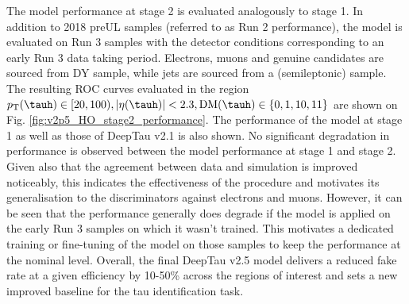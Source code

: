The model performance at stage 2 is evaluated analogously to stage 1. In addition to 2018 preUL samples (referred to as Run 2 performance), the model is evaluated on Run 3 samples with the detector conditions corresponding to an early Run 3 data taking period. Electrons, muons and genuine \tauh candidates are sourced from DY sample, while jets are sourced from a \ttbar (semileptonic) sample. The resulting ROC curves evaluated in the region $p_\text{T}(\tauh) \in [20,100), |\eta(\tauh)| < 2.3, \text{DM}(\tauh) \in \{0,1,10,11\}$ are shown on Fig. \ref{fig:v2p5_HO_stage2_performance}. The performance of the model at stage 1 as well as those of DeepTau v2.1 is also shown. No significant degradation in performance is observed between the model performance at stage 1 and stage 2. Given also that the agreement between data and simulation is improved noticeably, this indicates the effectiveness of the procedure and motivates its generalisation to the discriminators against electrons and muons. However, it can be seen that the performance generally does degrade if the model is applied on the early Run 3 samples on which it wasn't trained. This motivates a dedicated training or fine-tuning of the model on those samples to keep the performance at the nominal level. Overall, the final DeepTau v2.5 model delivers a reduced fake rate at a given \tauh efficiency by 10-50\% across the regions of interest and sets a new improved baseline for the tau identification task.

